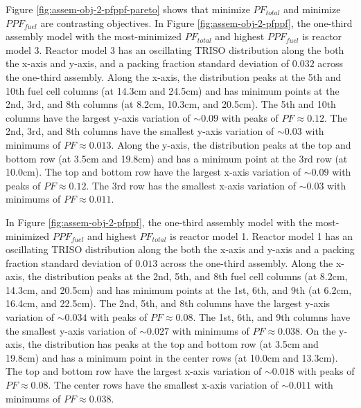 Figure \ref{fig:assem-obj-2-pfppf-pareto} shows that minimize $PF_{total}$ and 
minimize $PPF_{fuel}$ are contrasting objectives. 
In Figure \ref{fig:assem-obj-2-pfppf}, the one-third assembly model with 
the most-minimized $PF_{total}$ and highest $PPF_{fuel}$ is reactor model 3. 
Reactor model 3 has an oscillating TRISO distribution along the both the 
x-axis and y-axis, and a packing fraction standard deviation of $0.032$ across the 
one-third assembly. 
Along the x-axis, the distribution peaks at the 5th and 10th fuel cell columns 
(at 14.3cm and 24.5cm) and has minimum points at the 2nd, 3rd, and 8th columns 
(at 8.2cm, 10.3cm, and 20.5cm).
The 5th and 10th columns have the largest y-axis variation of $\sim0.09$ with peaks 
of $PF\approx 0.12$.
The 2nd, 3rd, and 8th columns have the smallest y-axis variation of $\sim0.03$ with 
minimums of $PF\approx0.013$.
Along the y-axis, the distribution peaks at the top and bottom row (at 3.5cm and 
19.8cm) and has a minimum point at the 3rd row (at 10.0cm). 
The top and bottom row have the largest x-axis variation of $\sim0.09$ with 
peaks of $PF\approx0.12$. 
The 3rd row has the smallest x-axis variation of $\sim0.03$ with minimums of 
$PF\approx0.011$. 

In Figure \ref{fig:assem-obj-2-pfppf}, the one-third assembly model with 
the most-minimized $PPF_{fuel}$ and highest $PF_{total}$ is reactor model 1.
Reactor model 1 has an oscillating TRISO distribution along the both the 
x-axis and y-axis and a packing fraction standard deviation of $0.013$ across the 
one-third assembly.
Along the x-axis, the distribution peaks at the 2nd, 5th, and 8th fuel cell columns (at 
8.2cm, 14.3cm, and 20.5cm) and has minimum points at the 1st, 6th, and 9th (at 6.2cm, 
16.4cm, and 22.5cm).
The 2nd, 5th, and 8th columns have the largest y-axis variation of $\sim0.034$ with 
peaks of $PF\approx0.08$.
The 1st, 6th, and 9th columns have the smallest y-axis variation of $\sim0.027$ with 
minimums of $PF\approx0.038$. 
On the y-axis, the distribution has peaks at the top and bottom row (at 3.5cm and 
19.8cm) and has a minimum point in the center rows (at 10.0cm and 13.3cm).
The top and bottom row have the largest x-axis variation of $\sim0.018$ with 
peaks of $PF\approx0.08$.
The center rows have the smallest x-axis variation of $\sim0.011$ with minimums 
of $PF\approx0.038$. 

